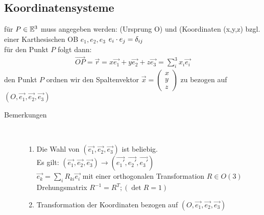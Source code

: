 \subsection{Koordinatensysteme}
für $P\in\mathbb{E}^3$ muss angegeben werden: (Ursprung O) und (Koordinaten (x,y,z) bzgl. einer Karthesischen OB $e_1,e_2,e_3$ $e_i\cdot e_j=\delta_{ij}$\\
für den Punkt $P$ folgt dann:
\begin{align*}
\vec{OP}=\vec{r}=x\vec{e_1}+y\vec{e_2}+z\vec{e_3}=\sum_i^3 x_i\vec{e_i}
\end{align*}
den Punkt $P$ ordnen wir den Spaltenvektor $\vec{x}=\begin{pmatrix}
x \\ 
y \\ 
z
\end{pmatrix} $ zu bezogen auf $(O,\vec{e_1},\vec{e_2},\vec{e_3})$
\begin{description}
\item[Bemerkungen]~\par
\begin{enumerate}
\item Die Wahl von $(\vec{e_1},\vec{e_2},\vec{e_3})$ ist beliebig.\\
Es gilt: $(\vec{e_1},\vec{e_2},\vec{e_3})\rightarrow(\vec{e_1'},\vec{e_2'},\vec{e_3'})$\\
$\vec{e_k}=\sum_i R_{ki} \vec{e_i}$ mit einer orthogonalen Transformation $R\in O(3)$
Drehungsmatrix $R^{-1}=R^T; (\det R=1)$
\item Transformation der Koordinaten bezogen auf $(O,\vec{e_1},\vec{e_2},\vec{e_3})$
\end{enumerate}
\end{description}

